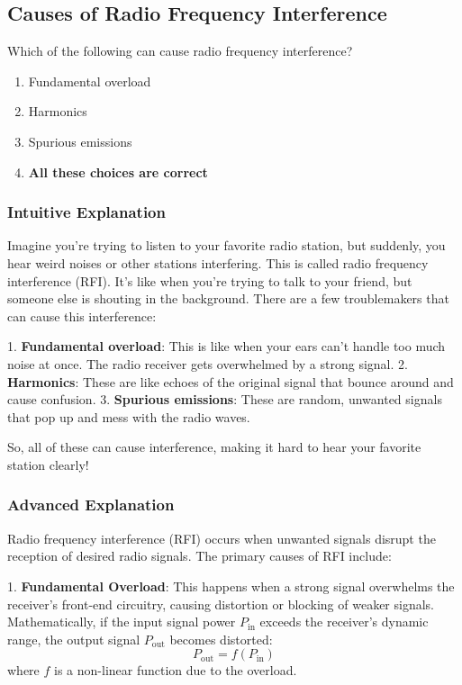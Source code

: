 \subsection{Causes of Radio Frequency Interference}
\label{T7B03}

\begin{tcolorbox}[colback=gray!10!white,colframe=black!75!black,title=T7B03]
Which of the following can cause radio frequency interference?
\begin{enumerate}[label=\Alph*]
    \item Fundamental overload
    \item Harmonics
    \item Spurious emissions
    \item \textbf{All these choices are correct}
\end{enumerate}
\end{tcolorbox}

\subsubsection{Intuitive Explanation}
Imagine you're trying to listen to your favorite radio station, but suddenly, you hear weird noises or other stations interfering. This is called radio frequency interference (RFI). It's like when you're trying to talk to your friend, but someone else is shouting in the background. There are a few troublemakers that can cause this interference:

1. \textbf{Fundamental overload}: This is like when your ears can't handle too much noise at once. The radio receiver gets overwhelmed by a strong signal.
2. \textbf{Harmonics}: These are like echoes of the original signal that bounce around and cause confusion.
3. \textbf{Spurious emissions}: These are random, unwanted signals that pop up and mess with the radio waves.

So, all of these can cause interference, making it hard to hear your favorite station clearly!

\subsubsection{Advanced Explanation}
Radio frequency interference (RFI) occurs when unwanted signals disrupt the reception of desired radio signals. The primary causes of RFI include:

1. \textbf{Fundamental Overload}: This happens when a strong signal overwhelms the receiver's front-end circuitry, causing distortion or blocking of weaker signals. Mathematically, if the input signal power \( P_{\text{in}} \) exceeds the receiver's dynamic range, the output signal \( P_{\text{out}} \) becomes distorted:
   \[
   P_{\text{out}} = f(P_{\text{in}})
   \]
   where \( f \) is a non-linear function due to the overload.


